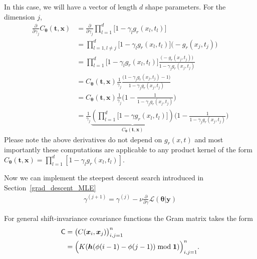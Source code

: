\documentclass{iitthesis}          %
\newcommand{\bm}[1]{\boldsymbol{#1}}
\newcommand{\vtheta}{{\bm{\theta}}}
\newcommand{\vh}{\bm{h}}
\newcommand{\vt}{\bm{t}}
\newcommand{\vx}{\bm{x}}
\newcommand{\vy}{\bm{y}}
\newcommand{\vone}{\bm{1}}
\newcommand{\mC}{\mathsf{C}}
\newcommand\secref{Section~\ref}
\begin{document}
In this case, we will have a vector of length $d$ shape parameters. For the dimension $j$,
\begin{align*}
\frac{\partial}{\partial \gamma_j} C_\vtheta(\vt, \vx) 
& =
\frac{\partial}{\partial \gamma_j} 
\prod_{l=1}^d \biggl[
1 - \gamma_l g_r(x_l,t_l) \biggr]
\\
& = 
\prod_{l=1, l \neq j}^d \biggl[
1 - \gamma_l g_r(x_l,t_l) \biggr]
\biggl( - g_r(x_j,t_j) \biggr)
\\
& =
\prod_{l=1}^d \biggl[
1 - \gamma_l g_r(x_l,t_l) \biggr]
\frac{
	\biggl( - g_r(x_j,t_j) \biggr)
}{
	1 - \gamma_j g_r(x_j,t_j) 
}
\\
& =
C_\vtheta(\vt, \vx) 
\frac{1}{\gamma_j}
\frac{
	\biggl(1 - \gamma_j g_r(x_j,t_j)  - 1 \biggr)
}{
	1 - \gamma_j g_r(x_j,t_j) 
}
\\
& =
C_\vtheta(\vt, \vx) 
\frac{1}{\gamma_j}
\biggl(
1 - 
\frac{1
}{
	1 - \gamma_j g_r(x_j,t_j) 
}
\biggr)
\\
& =
\frac{1}{\gamma_j} 
\underbrace{
	\left(
	\prod_{l=1}^d \biggl[
	1 - \gamma g_r(x_l,t_l) \biggr]
	\right) }_
{ C_\vtheta(\vt, \vx) }
\biggl(
1 - 
\frac{1}
{ 1 - \gamma_j g_r(x_j,t_j) }
\biggr)
\end{align*}
Please note the above derivatives do not depend on $g_r(x,t)$ and most importantly these computations are applicable to any product kernel of the form $ C_\vtheta(\vt, \vx) =
\prod_{l=1}^d [ 1 - \gamma_l g_r(x_l,t_l) ]$.

Now we can implement the steepest descent search introduced in \secref{grad_descent_MLE} 
\begin{align*}
\gamma^{(j+1)} = \gamma^{(j)} - \nu \frac{\partial}{\partial \gamma} \mathcal{L}(\vtheta | \vy)
\end{align*}


For general shift-invariance covariance functions the Gram matrix takes the form
\begin{align*}
\mC &= \bigl ( C(\vx_i, \vx_j) \bigr)_{i, j = 1}^n \\
& = \Bigl ( K(\vh(\phi(i-1) - \phi(j-1)) \bmod \vone ) \Bigr)_{i, j = 1}^n.
\end{align*}
\end{document}
